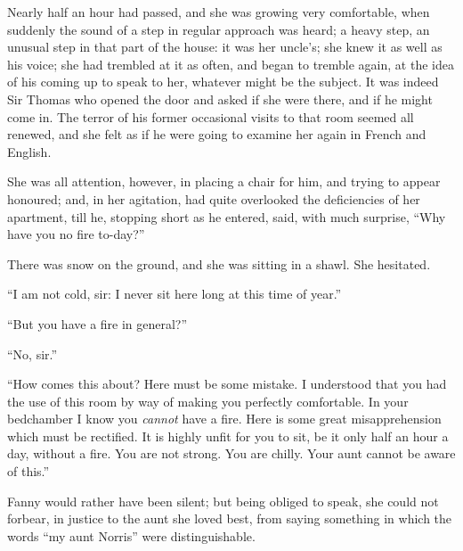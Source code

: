 \documentclass{article}
\begin{document}
Nearly half an hour had passed, and she was growing
very comfortable, when suddenly the sound of a step
in regular approach was heard; a heavy step, an unusual
step in that part of the house:  it was her uncle's;
she knew it as well as his voice; she had trembled at it
as often, and began to tremble again, at the idea of his
coming up to speak to her, whatever might be the subject.
It was indeed Sir Thomas who opened the door and asked
if she were there, and if he might come in.  The terror
of his former occasional visits to that room seemed
all renewed, and she felt as if he were going to examine
her again in French and English.

She was all attention, however, in placing a chair for him,
and trying to appear honoured; and, in her agitation,
had quite overlooked the deficiencies of her apartment, till he,
stopping short as he entered, said, with much surprise,
``Why have you no fire to-day?''

There was snow on the ground, and she was sitting in a shawl.
She hesitated.

``I am not cold, sir:  I never sit here long at this time
of year.''

``But you have a fire in general?''

``No, sir.''

``How comes this about?  Here must be some mistake.
I understood that you had the use of this room by way
of making you perfectly comfortable.  In your bedchamber
I know you \emph{cannot} have a fire.  Here is some great
misapprehension which must be rectified.  It is highly
unfit for you to sit, be it only half an hour a day,
without a fire.  You are not strong.  You are chilly.
Your aunt cannot be aware of this.''

Fanny would rather have been silent; but being obliged
to speak, she could not forbear, in justice to the aunt
she loved best, from saying something in which the words
``my aunt Norris'' were distinguishable.
\end{document}
